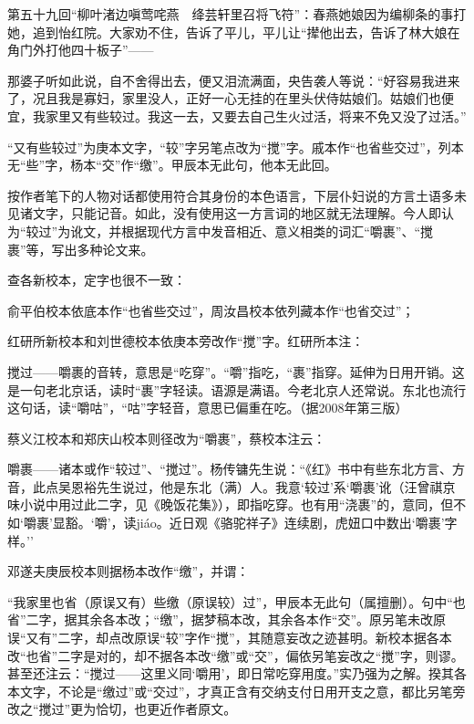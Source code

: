 {}

第五十九回``柳叶渚边嗔莺咤燕　绛芸轩里召将飞符''：春燕她娘因为编柳条的事打她，追到怡红院。大家劝不住，告诉了平儿，平儿让``撵他出去，告诉了林大娘在角门外打他四十板子''------

那婆子听如此说，自不舍得出去，便又泪流满面，央告袭人等说：``好容易我进来了，况且我是寡妇，家里没人，正好一心无挂的在里头伏侍姑娘们。姑娘们也便宜，我家里{又有些较过}。我这一去，又要去自己生火过活，将来不免又没了过活。''

``又有些较过''为庚本文字，``较''字另笔点改为``搅''字。戚本作``也省些交过''，列本无``些''字，杨本``交''作``缴''。甲辰本无此句，他本无此回。

按作者笔下的人物对话都使用符合其身份的本色语言，下层仆妇说的方言土语多未见诸文字，只能记音。如此，没有使用这一方言词的地区就无法理解。今人即认为``较过''为讹文，并根据现代方言中发音相近、意义相类的词汇``嚼裹''、``搅裹''等，写出多种论文来。

查各新校本，定字也很不一致：

俞平伯校本依底本作``也省些交过''，周汝昌校本依列藏本作``也省交过''；

红研所新校本和刘世德校本依庚本旁改作``搅''字。红研所本注：

搅过------嚼裹的音转，意思是``吃穿''。``嚼''指吃，``裹''指穿。延伸为日用开销。这是一句老北京话，读时``裹''字轻读。语源是满语。今老北京人还常说。东北也流行这句话，读``嚼咕''，``咕''字轻音，意思已偏重在吃。（据2008年第三版）

蔡义江校本和郑庆山校本则径改为``嚼裹''，蔡校本注云：

嚼裹------诸本或作``较过''、``搅过''。杨传镛先生说：``《红》书中有些东北方言、方音，此点吴恩裕先生说过，他是东北（满）人。我意`较过'系`嚼裹'讹（汪曾祺京味小说中用过此二字，见《晚饭花集》），即指吃穿。也有用``浇裹''的，意同，但不如`嚼裹'显豁。`嚼'，读jiáo。近日观《骆驼祥子》连续剧，虎妞口中数出`嚼裹'字样。''

邓遂夫庚辰校本则据杨本改作``缴''，并谓：

``我家里也省（原误又有）些缴（原误较）过''，甲辰本无此句（属擅删）。句中``也省''二字，据其余各本改；``缴''，据梦稿本改，其余各本作``交''。原另笔未改原误``又有''二字，却点改原误``较''字作``搅''，其随意妄改之迹甚明。新校本据各本改``也省''二字是对的，却不据各本改``缴''或``交''，偏依另笔妄改之``搅''字，则谬。甚至还注云：``搅过------这里义同`嚼用'，即日常吃穿用度。''实乃强为之解。揆其各本文字，不论是``缴过''或``交过''，才真正含有交纳支付日用开支之意，都比另笔旁改之``搅过''更为恰切，也更近作者原文。

